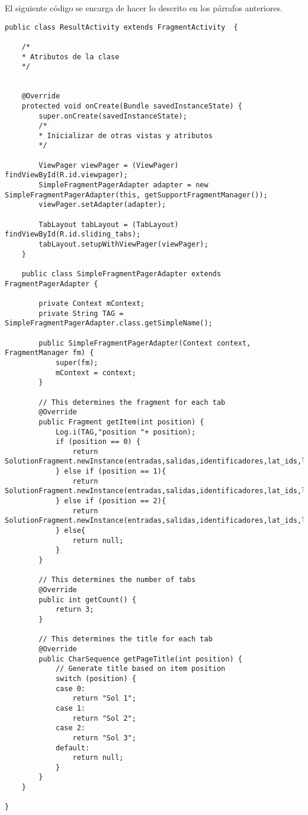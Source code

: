 El siguiente código se encarga de hacer lo descrito en los párrafos anteriores.
\begin{lstlisting}[caption=Código de una vista con tabs dentro de ella]
public class ResultActivity extends FragmentActivity  {

	/*
	* Atributos de la clase
	*/
	
	
	@Override
	protected void onCreate(Bundle savedInstanceState) {
		super.onCreate(savedInstanceState);
		/*
		* Inicializar de otras vistas y atributos
		*/
		
		ViewPager viewPager = (ViewPager) findViewById(R.id.viewpager);
		SimpleFragmentPagerAdapter adapter = new SimpleFragmentPagerAdapter(this, getSupportFragmentManager());
		viewPager.setAdapter(adapter);
		
		TabLayout tabLayout = (TabLayout) findViewById(R.id.sliding_tabs);
		tabLayout.setupWithViewPager(viewPager);
	}
	
	public class SimpleFragmentPagerAdapter extends FragmentPagerAdapter {
	
		private Context mContext;
		private String TAG = SimpleFragmentPagerAdapter.class.getSimpleName();
		
		public SimpleFragmentPagerAdapter(Context context, FragmentManager fm) {
			super(fm);
			mContext = context;
		}
		
		// This determines the fragment for each tab
		@Override
		public Fragment getItem(int position) {
			Log.i(TAG,"position "+ position);
			if (position == 0) {
				return SolutionFragment.newInstance(entradas,salidas,identificadores,lat_ids,lon_ids,lat_city,lon_city);
			} else if (position == 1){
				return SolutionFragment.newInstance(entradas,salidas,identificadores,lat_ids,lon_ids,lat_city,lon_city);
			} else if (position == 2){
				return SolutionFragment.newInstance(entradas,salidas,identificadores,lat_ids,lon_ids,lat_city,lon_city);
			} else{
				return null;
			}
		}
		
		// This determines the number of tabs
		@Override
		public int getCount() {
			return 3;
		}
		
		// This determines the title for each tab
		@Override
		public CharSequence getPageTitle(int position) {
			// Generate title based on item position
			switch (position) {
			case 0:
				return "Sol 1";
			case 1:
				return "Sol 2";
			case 2:
				return "Sol 3";
			default:
				return null;
			}
		}
	}

}
\end{lstlisting}
